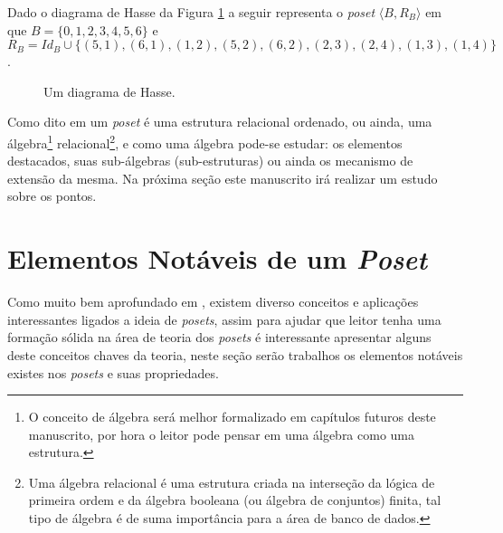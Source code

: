 \begin{example}
	Dado o diagrama de Hasse da Figura \ref{fig:DiagramaHasse6} a seguir representa o \textit{poset} $\langle B, R_B \rangle$ em que $B = \{0, 1, 2, 3, 4, 5, 6\}$ e $R_B = Id_B \cup \{(5, 1), (6, 1), (1, 2), (5, 2), (6, 2), (2, 3), (2, 4), (1, 3), (1, 4)\}$.
	
	\begin{figure}[h]
		\centering
		\caption{Um diagrama de Hasse.}
		\label{fig:DiagramaHasse6}
	\end{figure}
\end{example}

Como dito em \cite{carmo2013} um \textit{poset} é uma estrutura relacional ordenado, ou ainda, uma álgebra\footnote{O conceito de álgebra será melhor formalizado em capítulos futuros deste manuscrito, por hora o leitor pode pensar em uma álgebra como uma estrutura.} relacional\footnote{Uma álgebra relacional é uma estrutura criada na interseção da lógica de primeira ordem e da álgebra booleana (ou álgebra de conjuntos) finita, tal tipo de álgebra é de suma importância para a área de banco de dados.}, e como uma álgebra pode-se estudar: os elementos destacados, suas sub-álgebras (sub-estruturas) ou ainda os mecanismo de extensão da mesma. Na próxima seção este manuscrito irá realizar um estudo sobre os pontos.

\section{Elementos Notáveis de um \textit{Poset}}\label{sec:ElementosNotaveisPoset}

Como muito bem aprofundado em \cite{carmo2013, morgado1962poset, neggers1998poset}, existem diverso conceitos e aplicações interessantes ligados a ideia de \textit{posets}, assim para ajudar que leitor tenha uma formação sólida na área de teoria dos \textit{posets} é interessante apresentar alguns deste conceitos chaves da teoria, neste seção serão trabalhos os elementos notáveis existes nos \textit{posets} e suas propriedades.

